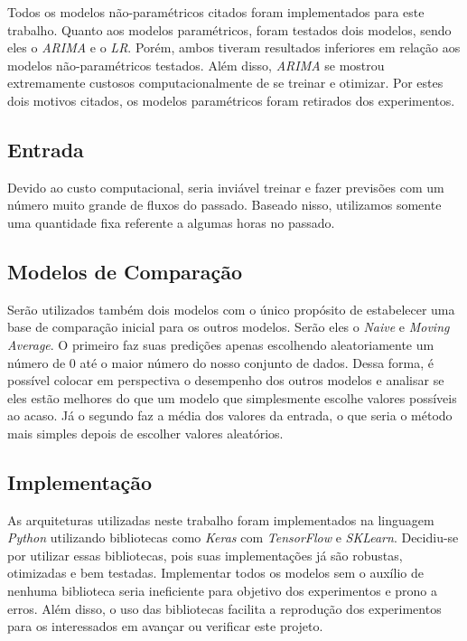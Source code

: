 
Todos os modelos não-paramétricos citados foram implementados para este trabalho. Quanto aos modelos paramétricos, foram testados dois modelos, sendo eles o \textit{\acrshort{ARIMA}} e o \textit{\acrshort{LR}}. Porém, ambos tiveram resultados inferiores em relação aos modelos não-paramétricos testados. Além disso, \textit{\acrshort{ARIMA}} se mostrou extremamente custosos computacionalmente de se treinar e otimizar. Por estes dois motivos citados, os modelos paramétricos foram retirados dos experimentos.

\subsection{Entrada}

Devido ao custo computacional, seria inviável treinar e fazer previsões com um número muito grande de fluxos do passado. Baseado nisso, utilizamos somente uma quantidade fixa referente a algumas horas no passado.

\subsection{Modelos de Comparação}

Serão utilizados também dois modelos com o único propósito de estabelecer uma base de comparação inicial para os outros modelos. Serão eles o \textit{Naive} e \textit{Moving Average}. O primeiro faz suas predições apenas escolhendo aleatoriamente um número de 0 até o maior número do nosso conjunto de dados. Dessa forma, é possível colocar em perspectiva o desempenho dos outros modelos e analisar se eles estão melhores do que um modelo que simplesmente escolhe valores possíveis ao acaso. Já o segundo faz a média dos valores da entrada, o que seria o método mais simples depois de escolher valores aleatórios.

\subsection{Implementação}

As arquiteturas utilizadas neste trabalho foram implementados na linguagem \textit{Python} utilizando bibliotecas como \textit{Keras} com \textit{TensorFlow} e \textit{SKLearn}. Decidiu-se por utilizar essas bibliotecas, pois suas implementações já são robustas, otimizadas e bem testadas. Implementar todos os modelos sem o auxílio de nenhuma biblioteca seria ineficiente para objetivo dos experimentos e prono a erros. Além disso, o uso das bibliotecas facilita a reprodução dos experimentos para os interessados em avançar ou verificar este projeto.

